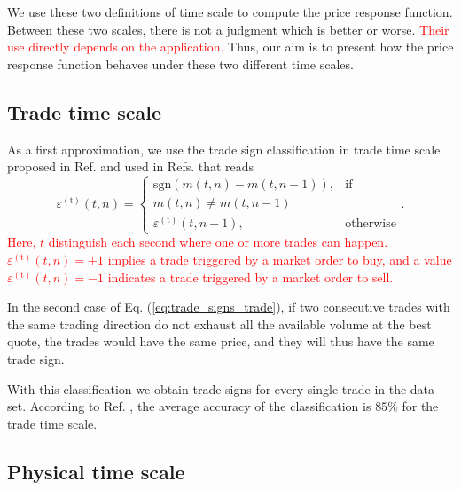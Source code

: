 We use these two definitions of time scale to compute the price response
function. Between these two scales, there is not a judgment which is better or
worse. \textcolor{red}{Their use directly depends on the application.} Thus, our aim is to
present how the price response function behaves under these two different time
scales.

\subsection{Trade time scale}\label{subsec:trade_time}

As a first approximation, we use the trade sign classification in trade time
scale proposed in Ref. \cite{Wang_2016_cross} and used in Refs.
\cite{my_paper_response_financial,Wang_2016_avg,Wang_2017,Wang_2018_copulas}
that reads
\begin{equation}\label{eq:trade_signs_trade}
    \varepsilon^{\left(\textrm{t}\right)}\left(t,n\right)=\left\{
    \begin{array}{cc}
    \text{sgn}\left(m\left(t,n\right)-m\left(t,n-1\right)\right),
    & \text{if }\\ m\left(t,n\right) \ne m\left(t,n-1\right)\\
    \varepsilon^{\left(\textrm{t}\right)}\left(t,n-1\right),
    & \text{otherwise}
    \end{array}\right..
\end{equation}
\textcolor{red}{Here, $t$ distinguish each second where one or more trades can happen.
$\varepsilon^{\left(\textrm{t}\right)}\left( t,n \right) = +1$ implies a
trade triggered by a market order to buy, and a value
$\varepsilon^{\left(\textrm{t}\right)}\left( t,n \right) = -1$ indicates a trade
triggered by a market order to sell.}

In the second case of Eq. (\ref{eq:trade_signs_trade}), if two consecutive
trades with the same trading direction do not exhaust all the available volume
at the best quote, the trades would have the same price, and they will thus
have the same trade sign.

With this classification we obtain trade signs for every single trade in the
data set. According to Ref. \cite{Wang_2016_cross}, the average accuracy of the
classification is $85\%$ for the trade time scale.

\subsection{Physical time scale}\label{subsec:physical_time}

